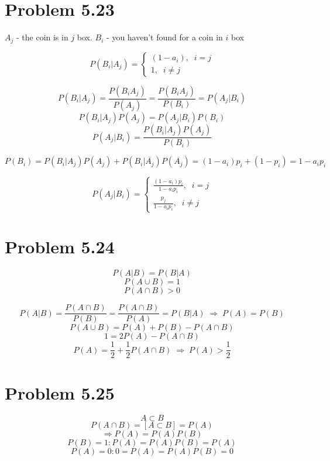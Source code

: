 \documentclass[12pt,letterpaper]{article}
\begin{document}

\section*{Problem 5.23}

$A_j$ - the coin is in $j$ box.
$B_i$ - you haven't found for a coin in $i$ box

\[ P(B_i|A_j) = \begin{cases}
    (1 - a_i), \;\; i = j \\
    1, \;\; i \neq j
\end{cases}
\]

\[ P(B_i|A_j) = \frac{P(B_i A_j)}{P(A_j)} = \frac{P(B_i A_j)}{P(B_i)} = P(A_j|B_i) \]
\[ P(B_i|A_j)P(A_j) = P(A_j|B_i)P(B_i) \]
\[ P(A_j|B_i) = \frac{P(B_i|A_j)P(A_j)}{P(B_i)} \]

\[ P(B_i) = P(B_i|A_j)P(A_j) + P(B_i|\overline{A_j})P(\overline{A_j}) = (1-a_i)p_i + (1-p_i) =
    1 - a_i p_i \]

\[ P(A_j|B_i) = \begin{cases}
    \frac{(1 - a_i) p_i}{1 - a_i p_i} , \;\; i = j \\
    \frac{p_j}{1 - a_i p_i}, \;\; i \neq j
\end{cases}
 \]


\section*{Problem 5.24}

\[ P(A|B) = P(B|A) \]
\[ P(A \cup B) = 1 \]
\[ P(A \cap B) > 0 \]

\[ P(A|B) = \frac{P(A \cap B)}{P(B)} = \frac{P(A \cap B)}{P(A)} = P(B|A) \;
    \Rightarrow \; P(A) = P(B) \]
    \[ P(A \cup B) =  P(A) + P(B) - P(A \cap B) \]
    \[ 1 = 2 P(A) - P(A \cap B) \]
    \[ P(A) = \frac{1}{2} + \frac{1}{2} P(A \cap B) \; \Rightarrow \; P(A) > \frac{1}{2} \]



\section*{Problem 5.25}

\[ A \subset B \]
\[ P(A \cap B) = [ A \subset B ] = P(A) \]
\[ \Rightarrow P(A) = P(A)P(B) \]
\[  P(B) = 1 : P(A) = P(A)P(B) = P(A) \]
\[  P(A) = 0 : 0 = P(A) = P(A)P(B) = 0 \]
\end{document}
